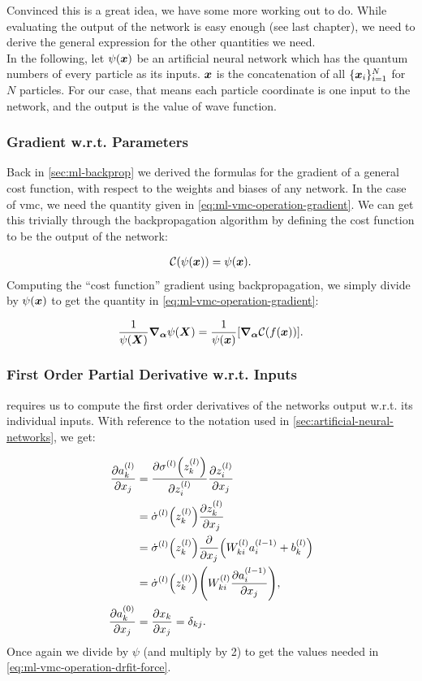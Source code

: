\documentclass[Thesis.tex]{subfiles}
\begin{document}
Convinced this is a great idea, we have some more working out to do. While
evaluating the output of the network is easy enough (see last chapter), we need
to derive the general expression for the other quantities we need.\\

In the following, let $\psi(\bm{x})$ be an artificial neural network which has the
quantum numbers of every particle as its inputs. $\bm{x}$ is the concatenation of
all $\{\bm{x}_i\}_{i=1}^N$ for $N$ particles. For our case, that means each
particle coordinate is one input to the network, and the output is the value of
wave function.

\subsubsection{Gradient w.r.t. Parameters}

Back in \cref{sec:ml-backprop} we derived the formulas for the gradient of a
general cost function, with respect to the weights and biases of any network. In
the case of \gls{vmc}, we need the quantity given in
\cref{eq:ml-vmc-operation-gradient}. We can get this trivially through the
backpropagation algorithm by defining the cost function to be the output of the
network:

\begin{align}
  \mathcal{C}(\psi(\bm{x})) = \psi(\bm{x}).
\end{align}
Computing the ``cost function'' gradient using backpropagation, we simply divide
by $\psi(\bm{x})$ to get the quantity in \cref{eq:ml-vmc-operation-gradient}:

\begin{align}
    \frac{1}{\psi(\bm{X})}\grad_{\bm{\alpha}}{\psi(\bm{X})} = \frac{1}{\psi(\bm{x})}\qty[\grad_{\bm{\alpha}}{\mathcal{C}(f(\bm{x}))}].
\end{align}

\subsubsection{First Order Partial Derivative w.r.t. Inputs}

 requires us to compute the first order
derivatives of the networks output w.r.t. its individual inputs. With reference
to the notation used in \cref{sec:artificial-neural-networks}, we get:

\begin{align}
  \pdv{a_k^{(l)}}{x_j} &= \pdv{\sigma^{(l)}\qty(z_k^{(l)})}{z_i^{(l)}}\pdv{z_i^{(l)}}{x_j}\\
  &= \dot\sigma^{(l)}\qty(z_k^{(l)})\pdv{z_k^{(l)}}{x_j}\\
  &= \dot\sigma^{(l)}\qty(z_k^{(l)})\pdv{}{x_j}\qty(W_{ki}^{(l)}a_i^{(l-1)} + b^{(l)}_k)\\
  &= \dot\sigma^{(l)}\qty(z_k^{(l)})\qty(W^{(l)}_{ki}\pdv{a_i^{(l-1)}}{x_j})\label{eq:first-order-partial-nn},\\
  \pdv{a_k^{(0)}}{x_j} &= \pdv{x_k}{x_j} = \delta_{kj}.
\end{align}
Once again we divide by $\psi$ (and multiply by 2) to get the values needed in
\cref{eq:ml-vmc-operation-drfit-force}.
\end{document}
